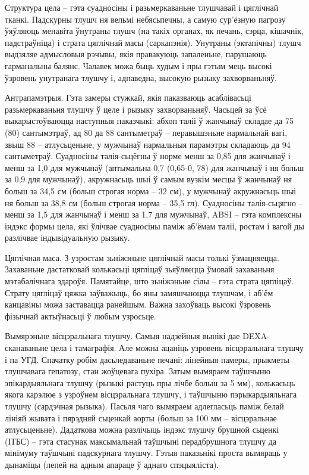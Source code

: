 Структура цела – гэта суадносіны і разьмеркаваньне тлушчавай і цяглічнай тканкі. Падскурны тлушч ня вельмі небясьпечны, а самую сур'ёзную пагрозу ўяўляюць менавіта ўнутраны тлушч (на такіх органах, як печань, сэрца, кішачнік, падстраўніца) і страта цяглічнай масы (саркапэнія). Унутраны (эктапічны) тлушч выдзяляе адмысловыя рэчывы, якія правакуюць запаленьне, парушаюць гарманальны балянс. Чалавек можа быць худым і пры гэтым мець высокі ўзровень унутранага тлушчу і, адпаведна, высокую рызыку захворваньняў.

Антрапамэтрыя.
Гэта замеры стужкай, якія паказваюць асаблівасьці разьмеркаваньня тлушчу ў целе і рызыку захворваньняў. Часьцей за ўсё выкарыстоўваюцца наступныя паказчыкі: абхоп таліі ў жанчынаў складае да 75 (80) сантымэтраў, ад 80 да 88 сантыметраў – перавышэньне нармальнай вагі, звыш 88 – атлусьценьне, у мужчынаў нармальныя парамэтры складаюць да 94 сантыметраў. Суадносіны талія-сьцёгны ў норме менш за 0,85 для жанчынаў і менш за 1,0 для мужчынаў (аптымальна 0,7 (0,65-0, 78) для жанчынаў і ня больш за 0,9 для мужчынаў), акружнасьць шыі ў самым вузкім месцы ў жанчынаў ня больш за 34,5 см (больш строгая норма – 32 см), у мужчынаў акружнасьць шыі ня больш за 38,8 см (больш строгая норма – 35,5 гл). Суадносіны талія-сьцягно – менш за 1,5 для жанчынаў і менш за 1,7 для мужчынаў, ABSI – гэта комплексны індэкс формы цела, які ўлічвае суадносіны паміж аб'ёмам таліі, ростам і вагой ды разлічвае індывідуальную рызыку.

Цяглічная маса.
З узростам зьніжэньне цяглічнай масы толькі ўзмацняецца. Захаваньне дастатковай колькасьці цягліцаў зьяўляецца ўмовай захаваньня мэтабалічнага здароўя. Памятайце, што зьніжэньне сілы – гэта страта цягліцаў. Страту цягліцаў цяжка заўважыць, бо яны замяшчаюцца тлушчам, і аб'ём канцавіны можа заставацца ранейшым. Важна захоўваць высокі ўзровень фізычнай актыўнасьці ў любым узросьце.

Вымярэньне вісцэральнага тлушчу.
Самыя надзейныя вынікі дае DEXA-сканаваньне цела і тамаграфія. Але можна ацаніць узровень вісцэральнага тлушчу і па УГД. Спачатку робім дасьледаваньне печані: лінейныя памеры, прыкметы тлушчавага гепатозу, стан жоўцевага пухіра. Затым вымяраем таўшчыню эпікардыяльнага тлушчу (рызыкі растуць пры лічбе больш за 5 мм), колькасьць якога карэлюе з узроўнем вісцэральнага тлушчу, і таўшчыню пэрыкардыяльнага тлушчу (сардэчная рызыка). Пасьля чаго вымяраем адлегласьць паміж белай лініяй жывата і пярэдняй сьценкай аорты (больш за 100 мм – вісцэральнае атлусьценьне). Дадаткова можна разлічыць індэкс тлушчу брушной сьценкі (ІТБС) – гэта стасунак максымальнай таўшчыні перадбрушнога тлушчу да мінімуму таўшчыні падскурнага тлушчу. Гэтыя паказьнікі проста вымяраць у дынаміцы (лепей на адным апараце ў аднаго спэцыяліста).

